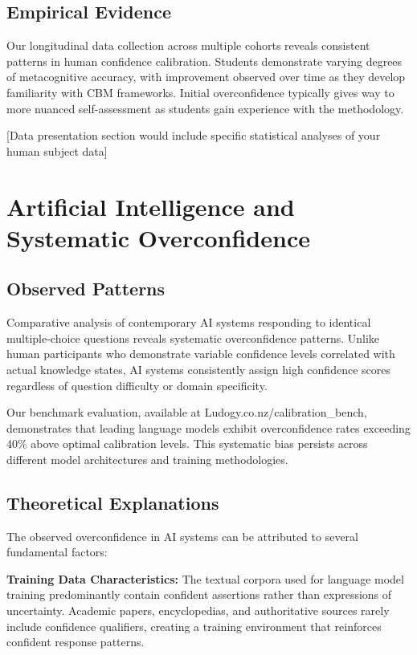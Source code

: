 \documentclass[sigconf]{acmart}
\begin{document}
\subsection{Empirical Evidence}

Our longitudinal data collection across multiple cohorts reveals consistent patterns in human confidence calibration. Students demonstrate varying degrees of metacognitive accuracy, with improvement observed over time as they develop familiarity with CBM frameworks. Initial overconfidence typically gives way to more nuanced self-assessment as students gain experience with the methodology.

[Data presentation section would include specific statistical analyses of your human subject data]

\section{Artificial Intelligence and Systematic Overconfidence}

\subsection{Observed Patterns}

Comparative analysis of contemporary AI systems responding to identical multiple-choice questions reveals systematic overconfidence patterns. Unlike human participants who demonstrate variable confidence levels correlated with actual knowledge states, AI systems consistently assign high confidence scores regardless of question difficulty or domain specificity.

Our benchmark evaluation, available at Ludogy.co.nz/calibration\_bench, demonstrates that leading language models exhibit overconfidence rates exceeding 40\% above optimal calibration levels. This systematic bias persists across different model architectures and training methodologies.

\subsection{Theoretical Explanations}

The observed overconfidence in AI systems can be attributed to several fundamental factors:

\textbf{Training Data Characteristics:} The textual corpora used for language model training predominantly contain confident assertions rather than expressions of uncertainty. Academic papers, encyclopedias, and authoritative sources rarely include confidence qualifiers, creating a training environment that reinforces confident response patterns.
\end{document}
